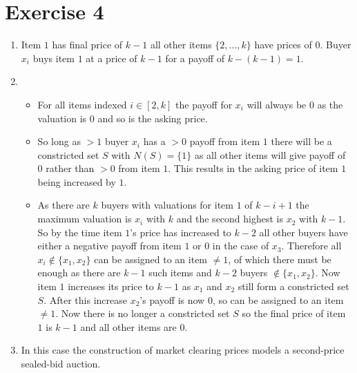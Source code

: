 \documentclass[]{article}
\begin{document}
\section*{Exercise 4}
\begin{enumerate}
	\item
	Item $1$ has final price of $k-1$ all other items $\{2,...,k\}$ have prices of $0$. Buyer $x_i$ buys item $1$ at a price of $k-1$ for a payoff of $k-(k-1)=1$.
	\item
	\begin{itemize}
		\item
		For all items indexed $i\in [2,k]$ the payoff for $x_i$ will always be 0 as the valuation is $0$ and so is the asking price.
		\item
		So long as $>1$ buyer $x_i$ has a $>0$ payoff from item $1$ there will be a constricted set $S$ with $N(S)=\{1\}$ as all other items will give payoff of 0 rather than $>0$ from item $1$. This results in the asking price of item $1$ being increased by $1$.
		\item
		As there are $k$ buyers with valuations for item $1$ of $k-i+1$ the maximum valuation is $x_i$ with $k$ and the second highest is $x_2$ with $k-1$. So by the time item $1$'s price has increased to $k-2$ all other buyers have either a negative payoff from item $1$ or $0$ in the case of $x_3$. Therefore all $x_i\notin \{x_1,x_2\}$ can be assigned to an item $\neq1$, of which there must be enough as there are $k-1$ such items and $k-2$ buyers $\notin \{x_1,x_2\}$. Now item $1$ increases its price to $k-1$ as $x_1$ and $x_2$ still form a constricted set $S$. After this increase $x_2$'s payoff is now $0$, so can be assigned to an item $\neq1$. Now there is no longer a constricted set $S$ so the final price of item $1$ is $k-1$ and all other items are $0$.
	\end{itemize}
	\item
	In this case the construction of market clearing prices models a second-price sealed-bid auction.
\end{enumerate}
\printbibliography
\end{document}
